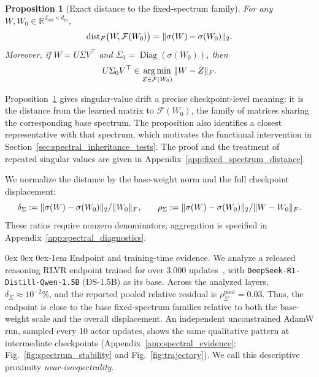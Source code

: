 \documentclass[11pt, a4paper]{utda}
\makeatletter
\renewcommand{\paragraph}{%
  \@startsection{paragraph}{4}%
  {\z@}{0ex \@plus 0ex \@minus 0ex}{-1em}%
  {\normalfont\normalsize\bfseries}%
}
\theoremstyle{plain}
\newtheorem{proposition}[theorem]{Proposition}
\theoremstyle{definition}
\theoremstyle{remark}
\makeatother
\begin{document}
\begin{proposition}[Exact distance to the fixed-spectrum family]
\label{prop:base_spectrum_projection}
For any
$W,W_0\in\mathbb{R}^{d_{\mathrm{out}}\times d_{\mathrm{in}}}$,
\begin{equation}
\label{eq:exact_spectrum_distance}
\small
    \operatorname{dist}_F
    \bigl(
        W,\mathcal F(W_0)
    \bigr)
    =
    \|\sigma(W)-\sigma(W_0)\|_2.
\end{equation}
Moreover, if
$W=U\Sigma V^\top$ and
$\Sigma_0=\operatorname{Diag}(\sigma(W_0))$, then
\begin{equation}
\label{eq:nearest_base_spectrum_point}
\small
    U\Sigma_0V^\top
    \in
    \operatorname*{arg\,min}_{Z\in\mathcal F(W_0)}
    \|W-Z\|_F.
\end{equation}
\end{proposition}
\noindent
Proposition~\ref{prop:base_spectrum_projection} gives singular-value drift a
precise checkpoint-level meaning: it is the distance from the learned matrix
to $\mathcal F(W_0)$, the family of matrices sharing the corresponding base
spectrum. The proposition also identifies a closest representative with that spectrum,
which motivates the functional intervention in
Section~\ref{sec:spectral_inheritance_tests}.
The proof and the treatment of repeated singular values are given in
Appendix~\ref{app:fixed_spectrum_distance}.




We normalize the distance by the base-weight norm and the full
checkpoint displacement:
\begin{equation}
\small
\label{eq:spectrum_distance_metrics}
\delta_\Sigma
:=\|\sigma(W)-\sigma(W_0)\|_2 / \|W_0\|_F,
\qquad
\rho_\Sigma
:=\|\sigma(W)-\sigma(W_0)\|_2 / \|W-W_0\|_F.
\end{equation}
These ratios require nonzero denominators; aggregation is
specified in Appendix~\ref{app:spectral_diagnostics}.

\paragraph{Endpoint and training-time evidence.}
We analyze a released reasoning RLVR endpoint trained for over
3,000 updates~\cite{liu2025prorl}, with
\texttt{DeepSeek-R1-Distill-Qwen-1.5B} (DS-1.5B) as its base.
Across the analyzed layers, $\delta_\Sigma\approx10^{-2}\%$,
and the reported pooled relative residual is
$\rho_\Sigma^{\mathrm{pool}}=0.03$.
Thus, the endpoint is close to the base fixed-spectrum families
relative to both the base-weight scale and the overall displacement.
An independent unconstrained AdamW run, sampled every 10 actor
updates, shows the same qualitative pattern at intermediate
checkpoints
(Appendix~\ref{app:spectral_evidence};
Fig.~\ref{fig:spectrum_stability} and Fig.~\ref{fig:trajectory}).
We call this descriptive proximity \emph{near-isospectrality}.
\end{document}
